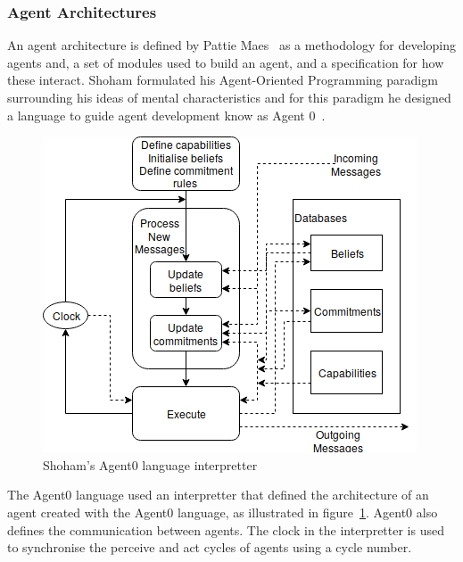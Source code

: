 \documentclass[]{final_report}
\begin{document}
\subsubsection{Agent Architectures}
An agent architecture is defined by Pattie Maes~\cite{Maes:1991:ANA:122344.122367} as a methodology for developing agents and, a set of modules used to build an agent, and a specification for how these interact. Shoham formulated his Agent-Oriented Programming paradigm~\cite{shoham1993agent} surrounding his ideas of mental characteristics and for this paradigm he designed a language to guide agent development know as Agent 0~\cite{shoham1991agent0}.\par
\begin{figure}
\vspace{-20pt}
\begin{framed}
	\center
	\includegraphics[width=\textwidth]{Agent0Arch.png}
	\caption{Shoham's Agent0 language interpretter~\cite{shoham1991agent0}}
	\label{fig:agent0int}
\end{framed}
\vspace{-20pt}
\end{figure}
The Agent0 language used an interpretter that defined the architecture of an agent created with the Agent0 language, as illustrated in figure~\ref{fig:agent0int}. Agent0 also defines the communication between agents. The clock in the interpretter is used to synchronise the perceive and act cycles of agents using a cycle number.\par 
\end{document}
